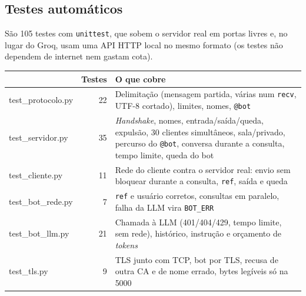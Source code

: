 \documentclass[11pt,a4paper]{article}
\newcommand{\cod}[1]{\texttt{#1}}
\begin{document}
\subsection{Testes automáticos}
São 105 testes com \cod{unittest}, que sobem o servidor real em portas livres e, no lugar do Groq,
usam uma API HTTP local no mesmo formato (os testes não dependem de internet nem gastam cota).
\begin{center}
\small
\begin{tabularx}{\linewidth}{>{\ttfamily}l r X}
\toprule
{\normalfont\bfseries Arquivo} & \textbf{Testes} & \textbf{O que cobre} \\
\midrule
test\_protocolo.py & 22 & Delimitação (mensagem partida, várias num \cod{recv}, UTF-8 cortado), limites, nomes, \cod{@bot} \\
test\_servidor.py  & 35 & \emph{Handshake}, nomes, entrada/saída/queda, expulsão, 30 clientes simultâneos,
                         sala/privado, percurso do \cod{@bot}, conversa durante a consulta, tempo limite, queda do bot \\
test\_cliente.py   & 11 & Rede do cliente contra o servidor real: envio sem bloquear durante a consulta, \cod{ref}, saída e queda \\
test\_bot\_rede.py & 7  & \cod{ref} e usuário corretos, consultas em paralelo, falha da LLM vira \cod{BOT\_ERR} \\
test\_bot\_llm.py  & 21 & Chamada à LLM (401/404/429, tempo limite, sem rede), histórico, instrução e orçamento de \emph{tokens} \\
test\_tls.py       & 9  & TLS junto com TCP, bot por TLS, recusa de outra CA e de nome errado, bytes legíveis só na 5000 \\
\bottomrule
\end{tabularx}
\end{center}
\end{document}

